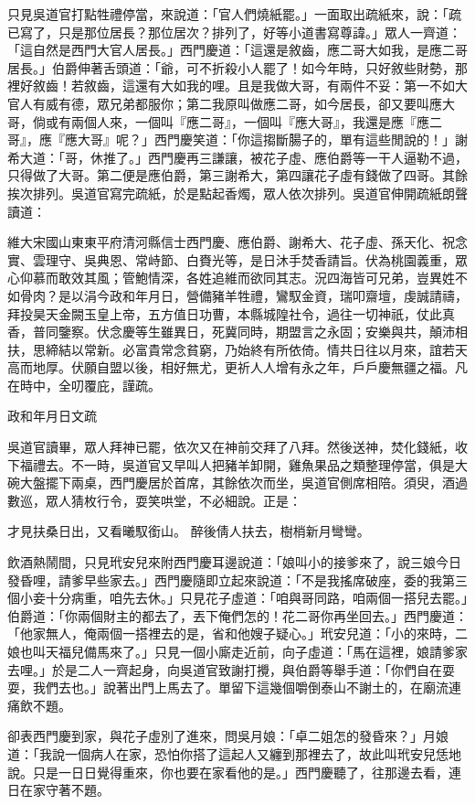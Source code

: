 只見吳道官打點牲禮停當，來說道：「官人們燒紙罷。」一面取出疏紙來，說：「疏已寫了，只是那位居長？那位居次？排列了，好等小道書寫尊諱。」眾人一齊道：「這自然是西門大官人居長。」西門慶道：「這還是敘齒，應二哥大如我，是應二哥居長。」伯爵伸著舌頭道：「爺，可不折殺小人罷了！如今年時，只好敘些財勢，那裡好敘齒！若敘齒，這還有大如我的哩。且是我做大哥，有兩件不妥：第一不如大官人有威有德，眾兄弟都服你；第二我原叫做應二哥，如今居長，卻又要叫應大哥，倘或有兩個人來，一個叫『應二哥』，一個叫『應大哥』，我還是應『應二哥』，應『應大哥』呢？」西門慶笑道：「你這搊斷腸子的，單有這些閒說的！」謝希大道：「哥，休推了。」西門慶再三謙讓，被花子虛、應伯爵等一干人逼勒不過，只得做了大哥。第二便是應伯爵，第三謝希大，第四讓花子虛有錢做了四哥。其餘挨次排列。吳道官寫完疏紙，於是點起香燭，眾人依次排列。吳道官伸開疏紙朗聲讀道：

維大宋國山東東平府清河縣信士西門慶、應伯爵、謝希大、花子虛、孫天化、祝念實、雲理守、吳典恩、常峙節、白賚光等，是日沐手焚香請旨。伏為桃園義重，眾心仰慕而敢效其風；管鮑情深，各姓追維而欲同其志。況四海皆可兄弟，豈異姓不如骨肉？是以涓今政和年月日，營備豬羊牲禮，鸞馭金資，瑞叩齋壇，虔誠請禱，拜投昊天金闕玉皇上帝，五方值日功曹，本縣城隍社令，過往一切神祇，仗此真香，普同鑒察。伏念慶等生雖異日，死冀同時，期盟言之永固；安樂與共，顛沛相扶，思締結以常新。必富貴常念貧窮，乃始終有所依倚。情共日往以月來，誼若天高而地厚。伏願自盟以後，相好無尤，更祈人人增有永之年，戶戶慶無疆之福。凡在時中，全叨覆庇，謹疏。

政和年月日文疏

吳道官讀畢，眾人拜神已罷，依次又在神前交拜了八拜。然後送神，焚化錢紙，收下福禮去。不一時，吳道官又早叫人把豬羊卸開，雞魚果品之類整理停當，俱是大碗大盤擺下兩桌，西門慶居於首席，其餘依次而坐，吳道官側席相陪。須臾，酒過數巡，眾人猜枚行令，耍笑哄堂，不必細說。正是：

才見扶桑日出，又看曦馭銜山。
醉後倩人扶去，樹梢新月彎彎。

飲酒熱鬧間，只見玳安兒來附西門慶耳邊說道：「娘叫小的接爹來了，說三娘今日發昏哩，請爹早些家去。」西門慶隨即立起來說道：「不是我搖席破座，委的我第三個小妾十分病重，咱先去休。」只見花子虛道：「咱與哥同路，咱兩個一搭兒去罷。」伯爵道：「你兩個財主的都去了，丟下俺們怎的！花二哥你再坐回去。」西門慶道：「他家無人，俺兩個一搭裡去的是，省和他嫂子疑心。」玳安兒道：「小的來時，二娘也叫天福兒備馬來了。」只見一個小廝走近前，向子虛道：「馬在這裡，娘請爹家去哩。」於是二人一齊起身，向吳道官致謝打攪，與伯爵等舉手道：「你們自在耍耍，我們去也。」說著出門上馬去了。單留下這幾個嚼倒泰山不謝土的，在廟流連痛飲不題。

卻表西門慶到家，與花子虛別了進來，問吳月娘：「卓二姐怎的發昏來？」月娘道：「我說一個病人在家，恐怕你搭了這起人又纏到那裡去了，故此叫玳安兒恁地說。只是一日日覺得重來，你也要在家看他的是。」西門慶聽了，往那邊去看，連日在家守著不題。

